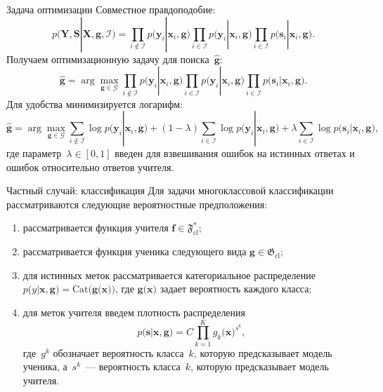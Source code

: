\documentclass[9pt,pdf,hyperref={unicode}]{beamer}
\begin{document}
\begin{frame}{Задача оптимизации}
\justifying
Совместное правдоподобие:
\[
p\bigr(\mathbf{Y}, \mathbf{S}|\mathbf{X}, \mathbf{g}, \mathcal{I}\bigr)=\prod_{i\not\in \mathcal{I}}p\bigr(\mathbf{y}_i|\mathbf{x}_i, \mathbf{g}\bigr)\prod_{i\in \mathcal{I}}p\bigr(\mathbf{y}_i|\mathbf{x}_i, \mathbf{g}\bigr)\prod_{i\in \mathcal{I}}p\bigr(\mathbf{s}_i|\mathbf{x}_i, \mathbf{g}\bigr).
\]
Получаем оптимизационную задачу для поиска~$\hat{\mathbf{g}}$:
\[
\hat{\mathbf{g}} = \arg\max_{\mathbf{g}\in \mathcal{G}} \prod_{i\not\in \mathcal{I}}p\bigr(\mathbf{y}_i|\mathbf{x}_i, \mathbf{g}\bigr)\prod_{i\in \mathcal{I}}p\bigr(\mathbf{y}_i|\mathbf{x}_i, \mathbf{g}\bigr)\prod_{i\in \mathcal{I}}p\bigr(\mathbf{s}_i|\mathbf{x}_i, \mathbf{g}\bigr).
\]
Для удобства минимизируется логарифм:
\[
\hat{\mathbf{g}} = \arg\max_{\mathbf{g}\in \mathcal{G}} \sum_{i\not\in \mathcal{I}}\log p\bigr(\mathbf{y}_i|\mathbf{x}_i, \mathbf{g}\bigr) + \left(1-\lambda\right)\sum_{i\in \mathcal{I}}\log p\bigr(\mathbf{y}_i|\mathbf{x}_i, \mathbf{g}\bigr) + \lambda\sum_{i\in \mathcal{I}}\log p\bigr(\mathbf{s}_i|\mathbf{x}_i, \mathbf{g}\bigr),
\]
где параметр~$\lambda \in [0,1]$ введен для взвешивания ошибок на истинных ответах и ошибок относительно ответов учителя.
\end{frame}
\begin{frame}{Частный случай: классификация}
\justifying
Для задачи многоклассовой классификации рассматриваются следующие вероятностные предположения:
\begin{enumerate}
	\item рассматривается функция учителя $\mathbf{f}\in\mathfrak{F}_{\text{cl}}^{*}$;
	\item рассматривается функция ученика следующего вида $\mathbf{g}\in\mathfrak{G}_{\text{cl}}$;
	\item для истинных меток рассматривается категориальное распределение~$p\bigr(y|\mathbf{x}, \mathbf{g}\bigr) = \text{Cat}\bigr(\mathbf{g}\bigr(\mathbf{x}\bigr)\bigr)$, где $\mathbf{g}\bigr(\mathbf{x}\bigr)$ задает вероятность каждого класса;
	\item для меток учителя введем плотность распределения
\[
	p\bigr(\mathbf{s}|\mathbf{x}, \mathbf{g}\bigr) = C\prod_{k=1}^{K}g_k\bigr(\mathbf{x}\bigr)^{s^k},
\]
где~$g^k$ обозначает вероятность класса~$k$, которую предсказывает модель ученика, а~$s^k$~--- вероятность класса~$k$, которую предсказывает модель учителя.
\end{enumerate}
\end{frame}
\end{document}
